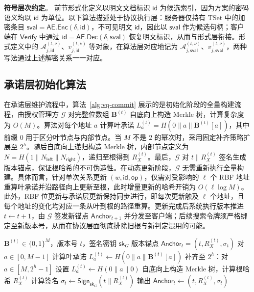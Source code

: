 \textbf{符号层次约定}。
前节形式化定义以明文文档标识 $\mathsf{id}$ 为候选索引，因为方案的密码语义均以 $\mathsf{id}$ 为单位。以下算法描述处于协议执行层：服务器仅持有 TSet 中的加密条目 $\mathsf{sval}=\mathsf{AE.Enc}(\delta,\mathsf{id})$，不可见明文 $\mathsf{id}$，因此以 $\mathsf{sval}$ 作为候选句柄；客户端在 $\mathsf{Verify}$ 中通过 $\mathsf{id}=\mathsf{AE.Dec}(\delta,\mathsf{sval})$ 恢复明文标识，从而与形式层衔接。形式定义中的 $\mathcal{A}_{j,\mathsf{id}}^{(t,\nu)}$、$v_{j,\mathsf{id}}^{(t,\nu)}$ 等对象，在算法层对应地记为 $\mathcal{A}_{j,\mathsf{sval}}^{(t,\nu)}$、$v_{j,\mathsf{sval}}^{(t,\nu)}$，两种写法通过上述解密关系一一对应。

\subsection{承诺层初始化算法}

在承诺层维护流程中，算法~\ref{alg:vq-commit} 展示的是初始化阶段的全量构建流程，由授权管理方 $\mathcal{G}$ 对完整位数组 $\mathbf{B}^{(t)}$ 自底向上构造 Merkle 树，计算复杂度为 $O(M)$。算法对每个地址 $a$ 计算叶承诺 $L_a^{(t)}=H(0\|a\|\mathbf{B}^{(t)}[a])$，其中前缀 $0$ 用于区分叶节点与内部节点。当 $M$ 不是 $2$ 的幂次时，采用固定补齐策略扩展至 $2^h$。随后自底向上递归构造 Merkle 树，内部节点定义为 $N=H(1\|N_{\mathsf{left}}\|N_{\mathsf{right}})$，递归至根得到 $R_X^{(t)}$。最后，$\mathcal{G}$ 对 $t\|R_X^{(t)}$ 签名生成版本锚点，保证根哈希的不可伪造性。在动态更新阶段，$\mathcal{G}$ 无需重新执行全量构建。具体而言，针对单次关系更新 $(w,\mathsf{id},\mathsf{op})$，仅需对受影响的 $\ell$ 个 RBF 地址重算叶承诺并沿路径向上更新至根，此时增量更新的哈希开销为 $O(\ell\log M)$。此外，RBF 位更新与承诺层更新保持同步进行，即每次更新触及 $\ell$ 个地址，且每个地址的变化均对应一条从叶到根的路径重算。更新完成后系统执行版本推进 $t\leftarrow t+1$，由 $\mathcal{G}$ 签发新锚点 $\mathsf{Anchor}_{t+1}$ 并分发至客户端；后续搜索令牌须严格绑定至新版本号，从而在协议层面彻底排除旧根与新判定混用的可能。

\begin{algorithm}[h]
\caption{承诺层初始化算法 $\mathsf{Commit}$}
\label{alg:vq-commit}
\begin{algorithmic}[1]
\REQUIRE $\mathbf{B}^{(t)}\in\{0,1\}^{M}$，版本号 $t$，签名密钥 $\mathsf{sk}_G$
\ENSURE 版本锚点 $\mathsf{Anchor}_t=(t,R_X^{(t)},\sigma_t)$
\STATE 对 $a\in[0,M-1]$ 计算叶承诺 $L_a^{(t)}\leftarrow H(0\|a\|\mathbf{B}^{(t)}[a])$
\STATE 补齐至 $2^h$：对 $a\in[M,2^h-1]$ 设置 $L_a^{(t)}\leftarrow H(0\|a\|0)$
\STATE 自底向上构造 Merkle 树，计算根哈希 $R_X^{(t)}$
\STATE 计算签名 $\sigma_t\leftarrow\mathsf{Sign}_{\mathsf{sk}_G}(t\|R_X^{(t)})$
\STATE 输出 $\mathsf{Anchor}_t\leftarrow(t,R_X^{(t)},\sigma_t)$
\end{algorithmic}
\end{algorithm}

